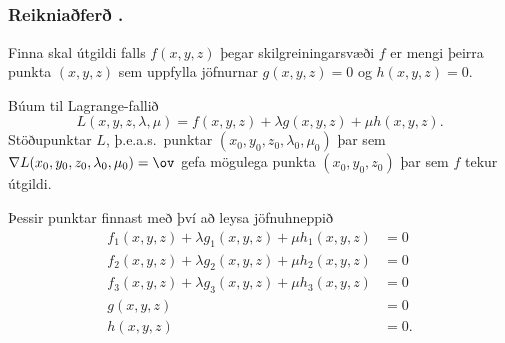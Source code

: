 \subsection{} 

\subsubsection{Reikniaðferð \kaflanr.}
Finna skal útgildi falls $f(x,y,z)$ þegar skilgreiningarsvæði $f$ er mengi þeirra punkta $(x,y,z)$ sem uppfylla jöfnurnar $g(x,y,z)=0$ og $h(x,y,z)=0$.  

Búum til Lagrange-fallið
$$L(x,y,z,\lambda,\mu)=f(x,y,z)+\lambda g(x,y,z)+\mu h(x,y,z).$$
Stöðupunktar $L$, þ.e.a.s.~punktar $(x_0,y_0,z_0,\lambda_0,\mu_0)$ þar sem $\nabla L(x_0,y_0,z_0,\lambda_0,\mu_0)=\ov$ gefa mögulega punkta $(x_0,y_0,z_0)$ þar sem $f$ tekur útgildi.

Þessir punktar finnast með því að leysa jöfnuhneppið
\begin{align*}
f_1(x,y,z)+\lambda g_1(x,y,z)+\mu h_1(x,y,z)&=0\\
f_2(x,y,z)+\lambda g_2(x,y,z)+\mu h_2(x,y,z)&=0\\
f_3(x,y,z)+\lambda g_3(x,y,z)+\mu h_3(x,y,z)&=0\\
g(x,y,z)&=0\\
h(x,y,z)&=0.
\end{align*}







